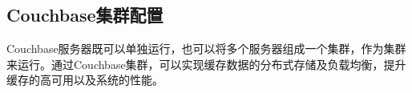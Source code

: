 







\subsection{Couchbase集群配置}
Couchbase服务器既可以单独运行，也可以将多个服务器组成一个集群，作为集群来运行。通过Couchbase集群，可以实现缓存数据的分布式存储及负载均衡，提升缓存的高可用以及系统的性能\cite{brown2013developing}。

